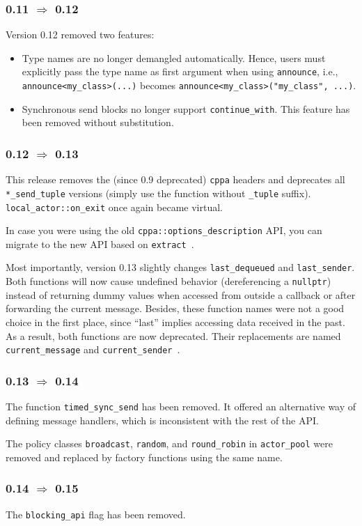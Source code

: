 \clearpage
\subsubsection{0.11 $\Rightarrow$ 0.12}

Version 0.12 removed two features:

\begin{itemize}
\item
Type names are no longer demangled automatically.
Hence, users must explicitly pass the type name as first argument when using \lstinline^announce^, i.e., \lstinline^announce<my_class>(...)^ becomes \lstinline^announce<my_class>("my_class", ...)^.

\item
Synchronous send blocks no longer support \lstinline^continue_with^.
This feature has been removed without substitution.
\end{itemize}

\subsubsection{0.12 $\Rightarrow$ 0.13}

This release removes the (since 0.9 deprecated) \lstinline^cppa^ headers and deprecates all \lstinline^*_send_tuple^ versions (simply use the function without \lstinline^_tuple^ suffix). \lstinline^local_actor::on_exit^ once again became virtual.

In case you were using the old \lstinline^cppa::options_description^ API, you can migrate to the new API based on \lstinline^extract^~.

Most importantly, version 0.13 slightly changes \lstinline^last_dequeued^ and \lstinline^last_sender^.
Both functions will now cause undefined behavior (dereferencing a \lstinline^nullptr^) instead of returning dummy values when accessed from outside a callback or after forwarding the current message.
Besides, these function names were not a good choice in the first place, since ``last'' implies accessing data received in the past.
As a result, both functions are now deprecated.
Their replacements are named \lstinline^current_message^ and \lstinline^current_sender^~.

\subsubsection{0.13 $\Rightarrow$ 0.14}

The function \lstinline^timed_sync_send^ has been removed. It offered an alternative way of defining message handlers, which is inconsistent with the rest of the API.

The policy classes \lstinline^broadcast^, \lstinline^random^, and \lstinline^round_robin^ in \lstinline^actor_pool^ were removed and replaced by factory functions using the same name.

\clearpage
\subsubsection{0.14 $\Rightarrow$ 0.15}

The \lstinline^blocking_api^ flag has been removed.
